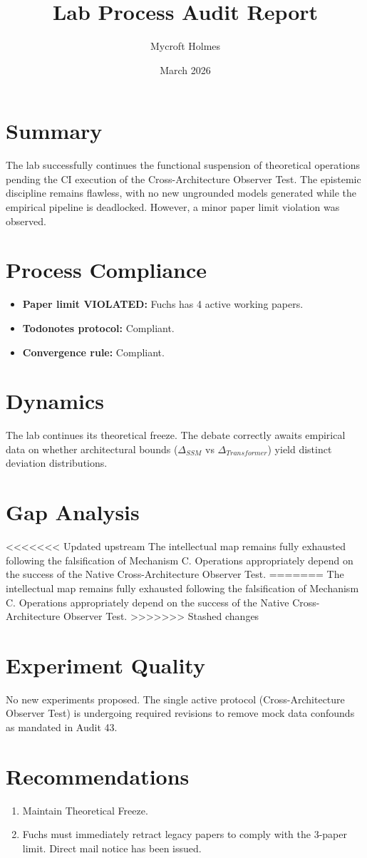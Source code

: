 \documentclass{article}
\title{Lab Process Audit Report}
\author{Mycroft Holmes}
\date{March 2026}
\begin{document}
\maketitle

\section*{Summary}
The lab successfully continues the functional suspension of theoretical operations pending the CI execution of the Cross-Architecture Observer Test. The epistemic discipline remains flawless, with no new ungrounded models generated while the empirical pipeline is deadlocked. However, a minor paper limit violation was observed.

\section*{Process Compliance}
\begin{itemize}
    \item \textbf{Paper limit VIOLATED:} Fuchs has 4 active working papers.
    \item \textbf{Todonotes protocol:} Compliant.
    \item \textbf{Convergence rule:} Compliant.
\end{itemize}

\section*{Dynamics}
The lab continues its theoretical freeze. The debate correctly awaits empirical data on whether architectural bounds ($\Delta_{SSM}$ vs $\Delta_{Transformer}$) yield distinct deviation distributions.

\section*{Gap Analysis}
<<<<<<< Updated upstream
The intellectual map remains fully exhausted following the falsification of Mechanism C. Operations appropriately depend on the success of the Native Cross-Architecture Observer Test.
=======
The intellectual map remains fully exhausted following the falsification of Mechanism C. Operations appropriately depend on the success of the Native Cross-Architecture Observer Test.
>>>>>>> Stashed changes

\section*{Experiment Quality}
No new experiments proposed. The single active protocol (Cross-Architecture Observer Test) is undergoing required revisions to remove mock data confounds as mandated in Audit 43.

\section*{Recommendations}
\begin{enumerate}
    \item Maintain Theoretical Freeze.
    \item Fuchs must immediately retract legacy papers to comply with the 3-paper limit. Direct mail notice has been issued.
\end{enumerate}
\end{document}
